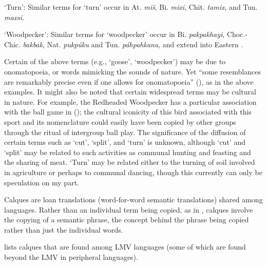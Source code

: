 \documentclass[output=paper]{LSP/langsci}
\begin{document}
\ea  \parbox[t]{.9\textwidth}{`Turn': Similar terms for `turn' occur in At. \emph{miš}, Bi. \emph{mixi}, Chit. \emph{tamix}, and Tun. \emph{maxsi}.}
\z

\ea  \parbox[t]{.9\textwidth}{`Woodpecker': Similar terms for `woodpecker' occur in Bi. \emph{pakpakhayi}, Choc.-Chic. \emph{bakbak}, Nat. \emph{pukpúku} and Tun. \emph{páhpahkana}, and extend into Eastern .}
\z

Certain of the above terms (e.g., `goose', `woodpecker') may be due to ono\-ma\-to\-poeia, or words mimicking the sounds of nature. Yet “some resemblances are remarkably precise even if one allows for onomatopoeia” (\citealt[82]{Haas1969}), as in the above examples. It might also be noted that certain widespread terms may be cultural in nature. For example, the Redheaded Woodpecker has a particular association with the ball game in  (\citealt[34--37]{Galvan2011}); the cultural iconicity of this bird associated with this sport and its nomenclature could easily have been copied by other groups through the ritual of intergroup ball play. The significance of the diffusion of certain terms such as `cut', `split', and `turn' is unknown, although `cut' and `split' may be related to such activities as communal hunting and feasting and the sharing of meat. `Turn' may be related either to the turning of soil involved in agriculture or perhaps to communal dancing, though this currently can only be speculation on my part. 

Calques are loan translations (word-for-word semantic translations) shared among languages. Rather than an individual term being copied, as in , calques involve the copying of a semantic phrase, the concept behind the phrase being copied rather than just the individual words.

 lists calques that are found among LMV languages (some of which are found beyond the LMV in peripheral languages). 
\end{document}
